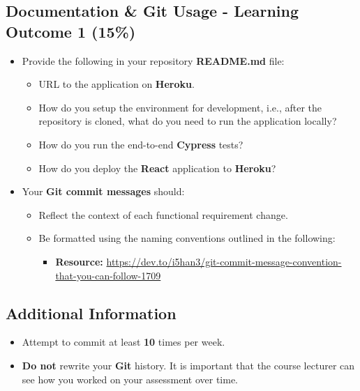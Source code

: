 \documentclass{article}
\begin{document}
\subsection*{Documentation \& Git Usage - Learning Outcome 1 (15\%)}
\begin{itemize}
	\item Provide the following in your repository \textbf{README.md} file:
	      \begin{itemize}
	      	\item URL to the application on \textbf{Heroku}.
	      	\item How do you setup the environment for development, i.e., after the repository is cloned, what do you need to run the application locally?
	      	\item How do you run the end-to-end \textbf{Cypress} tests?
	      	\item How do you deploy the \textbf{React} application to \textbf{Heroku}?
	      \end{itemize}
\end{itemize}
\begin{itemize}
	\item Your \textbf{Git commit messages} should:
	      \begin{itemize}
	      	\item Reflect the context of each functional requirement change. 
	      	\item Be formatted using the naming conventions outlined in the following:
	      	      \begin{itemize}
	      	      	\item \textbf{Resource:} \small\href{https://dev.to/i5han3/git-commit-message-convention-that-you-can-follow-1709}{https://dev.to/i5han3/git-commit-message-convention-that-you-can-follow-1709}
	      	      \end{itemize} 
	      \end{itemize}
\end{itemize}
          
\subsection*{Additional Information}
\begin{itemize}
    \item Attempt to commit at least \textbf{10} times per week.
    \item \textbf{Do not} rewrite your \textbf{Git} history. It is important that the course lecturer can see how you worked on your assessment over time. 
\end{itemize} 
\end{document}
